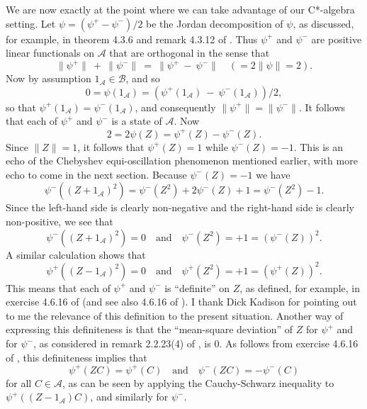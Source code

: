 \documentclass[12pt]{amsart}
\newcommand{\<}{\langle}
\renewcommand{\>}{\rangle}
\newcommand{\cA}{{\mathcal A}}
\newcommand{\cB}{{\mathcal B}}
\theoremstyle{definition}   %
\begin{document}
We are now exactly at the point where we can take advantage of
our C*-algebra setting. Let $\psi = (\psi^+ - \psi^-)/2$ be the Jordan
decomposition of $\psi$, as discussed, for example, in theorem 4.3.6 and 
remark 4.3.12 of \cite{KR1}. Thus $\psi^+$ and $\psi^-$ are
positive linear functionals on $\cA$ that are orthogonal in the sense
that 
\[
\|\psi^+\| \ + \ \|\psi^-\| \ = \ \|\psi^+ \ - \ \psi^-\| \quad (= 2\|\psi\| = 2)   .
\]
Now by assumption $1_\cA \in \cB$, and so
\[
0 = \psi(1_\cA) = (\psi^+(1_\cA) \ - \ \psi^-(1_\cA))/2   ,
\]
so that $\psi^+(1_\cA) = \psi^-(1_\cA)$, and consequently
$\|\psi^+\| = \|\psi^-\|$.
It follows that each of $\psi^+$ and $\psi^-$
is a state of $\cA$. Now
\[
2 = 2\psi(Z) = \psi^+(Z) - \psi^-(Z)   .
\]
Since $\|Z\| = 1$, it follows that $\psi^+(Z) = 1$ while $\psi^-(Z) = -1$.
This is an echo of the Chebyshev equi-oscillation phenomenon
mentioned earlier, with more echo to come in the next section. Because
$\psi^-(Z) = -1$ we have
\[
\psi^-((Z + 1_\cA)^2) = \psi^-(Z^2) + 2\psi^-(Z) + 1 = \psi^-(Z^2) - 1   .
\]
Since the left-hand side is clearly non-negative and the right-hand
side is clearly non-positive, we see that 
\[
\psi^-((Z + 1_\cA)^2) = 0 \quad \mathrm{and} \quad 
\psi^-(Z^2) = +1 = (\psi^-(Z))^2  .
\]
A similar calculation shows that 
\[
\psi^+((Z - 1_\cA)^2) = 0 \quad \mathrm{and} \quad
\psi^+(Z^2) = +1 = (\psi^+(Z))^2  .
\]
This means that each of $\psi^+$ and $\psi^-$ is ``definite'' on $Z$, as defined,
for example, in exercise 4.6.16 of \cite{KR1} (and see also 4.6.16
of \cite{KR3}). I thank Dick Kadison for pointing out to me the relevance of this 
definition to the present situation. Another way of expressing this
definiteness is that the ``mean-square deviation'' of $Z$ for 
$\psi^+$ and for $\psi^-$, as considered in remark 2.2.23(4) of \cite{Thr3}, is $0$.
As follows from exercise 4.6.16 of \cite{KR1}, this definiteness implies that
\[
\psi^+(ZC) = \psi^+(C) \quad \mathrm{and} \quad \psi^-(ZC) = - \psi^-(C)
\]
for all $C \in \cA$, as can be seen by applying the Cauchy-Schwarz
inequality to $\psi^+((Z - 1_\cA)C)$, and similarly for $\psi^-$. 
\end{document}
